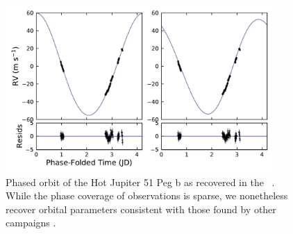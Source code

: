 \documentclass[modern]{aastex62}
\begin{document}
\begin{figure}
\centering
\includegraphics[width=4in]{51peg_planet}
\caption{Phased orbit of the Hot Jupiter 51 Peg b as recovered in the \wobble\ \RVs. While the phase coverage of \HARPS observations is sparse, we nonetheless recover orbital parameters consistent with those found by other \RV campaigns .}
\label{fig:51peg_planet}
\end{figure}
\end{document}
